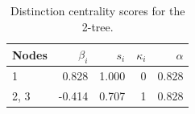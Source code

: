 \begin{table}
\centering
\caption{\label{tab:tree2}Distinction centrality scores for the 2-tree.}
\centering
\begin{tabular}[t]{lrrrr}
\toprule
Nodes & $\beta_i$ & $s_i$ & $\kappa_i$ & $\alpha$\\
\midrule
1 & 0.828 & 1.000 & 0 & 0.828\\
2, 3 & -0.414 & 0.707 & 1 & 0.828\\
\bottomrule
\end{tabular}
\end{table}
